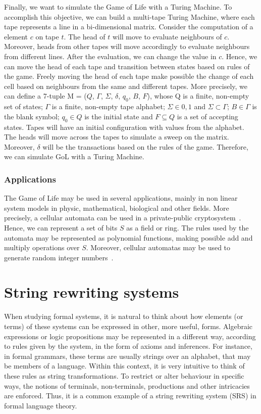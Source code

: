 \documentclass[12pt]{article}
\begin{document}
Finally, we want to simulate the Game of Life with a Turing Machine. To accomplish this objective, we can build a multi-tape Turing Machine, where each tape represents a line in a bi-dimensional matrix. Consider the computation of a element $c$ on tape $t$. The head of $t$ will move to evaluate neighbours of $c$. Moreover, heads from other tapes will move accordingly to evaluate neighbours from different lines. After the evaluation, we can change the value in $c$. Hence, we can move the head of each tape and transition between states based on rules of the game. Freely moving the head of each tape make possible the change of each cell based on neighbours from the same and different tapes. More precisely, we can define a 7-tuple M = ($Q$, $\Gamma$, $\Sigma$, $\delta$, $q_0$, $B$, $F$), whose Q is a finite, non-empty set of states; $\Gamma$ is a finite, non-empty tape alphabet; $\Sigma \in {0,1}$ and $\Sigma \subset \Gamma$; $B \in \Gamma$ is the blank symbol; $q_0 \in Q$ is the initial state and $F \subseteq Q$ is a set of accepting states. Tapes will have an initial configuration with values from the alphabet. The heads will move across the tapes to simulate a sweep on the matrix. Moreover, $\delta$ will be the transactions based on the rules of the game. Therefore, we can simulate GoL with a Turing Machine.

\subsubsection{Applications}

The Game of Life may be used in several applications, mainly in non linear system models in physic, mathematical, biological and other fields. More precisely, a cellular automata can be used in a private-public cryptosystem~\cite{Guan:article:1987:feb}. Hence, we can represent a set of bits $S$ as a field or ring. The rules used by the automata may be represented as polynomial functions, making possible add and multiply operations over $S$. Moreover, cellular automatas may be used to generate random integer numbers~\cite{Wolfram:article:1986:jun}.

\section{String rewriting systems}\label{sec:srs}

When studying formal systems, it is natural to think about how elements (or terms) of these systems can be expressed in other, more useful, forms. Algebraic expressions or logic propositions may be represented in a different way, according to rules given by the system, in the form of axioms and inferences. For instance, in formal grammars, these terms are usually strings over an alphabet, that may be members of a language. Within this context, it is very intuitive to think of these rules as string transformations. To restrict or alter behaviour in specific ways, the notions of terminals, non-terminals, productions and other intricacies are enforced. Thus, it is a common example of a string rewriting system (SRS) in formal language theory.
\end{document}
